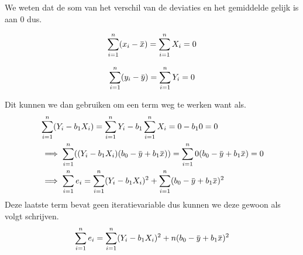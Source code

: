 \documentclass[11pt]{report}
\newcommand{\overbar}[1]{\mkern 1.5mu\overline{\mkern-1.5mu#1\mkern-1.5mu}\mkern 1.5mu}
\begin{document}
We weten dat de som van het verschil van de deviaties en het gemiddelde gelijk is aan 0 dus.
\noindent\begin{minipage}{.5\linewidth}
  \begin{equation*}
    \sum_{i=1}^n(x_i - \overbar{x}) = \sum_{i=1}^nX_i = 0
  \end{equation*}
\end{minipage}%
\begin{minipage}{.5\linewidth}
  \begin{equation*}
    \sum_{i=1}^n(y_i - \overbar{y}) = \sum_{i=1}^nY_i = 0
  \end{equation*}
\end{minipage}
Dit kunnen we dan gebruiken om een term weg te werken want als.
\begin{equation*}
  \begin{split}
    &\sum_{i=1}^n(Y_i - b_1X_i) = \sum_{i=1}^nY_i - b_1\sum_{i=1}^nX_i = 0 - b_10 = 0\\
    &\implies \sum_{i=1}^n((Y_i - b_1X_i)(b_0 - \overbar{y} + b_1\overbar{x})) = \sum_{i=1}^n0(b_0 - \overbar{y} + b_1\overbar{x}) = 0\\
    &\implies \sum_{i=1}^ne_i = \sum_{i=1}^n(Y_i-b_1X_i)^2 + \sum_{i=1}^n(b_0 - \overbar{y} + b_1\overbar{x})^2
  \end{split}
\end{equation*}
Deze laatste term bevat geen iteratievariable dus kunnen we deze gewoon als volgt schrijven.
\begin{equation*}
  \sum_{i=1}^ne_i = \sum_{i=1}^n(Y_i-b_1X_i)^2 + n(b_0 - \overbar{y} + b_1\overbar{x})^2
\end{equation*}

\newpage
\end{document}
